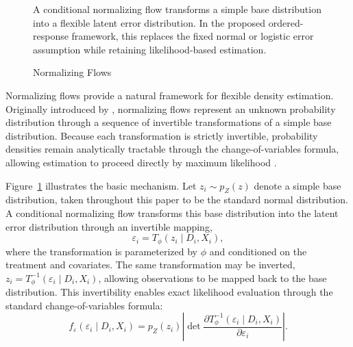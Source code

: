 \documentclass{article}
\begin{document}
\begin{figure}[hb!]
\caption{Normalizing Flows}
\label{fig:nf_error}
\begin{flushleft}
  {\footnotesize
A conditional normalizing flow transforms a simple base distribution into a flexible latent error distribution. In the proposed ordered-response framework, this replaces the fixed normal or logistic error assumption while retaining likelihood-based estimation.}
\end{flushleft}
\end{figure}

Normalizing flows provide a natural framework for flexible density estimation. Originally introduced by \citet{Rezende2016a}, normalizing flows represent an unknown probability distribution through a sequence of invertible transformations of a simple base distribution. Because each transformation is strictly invertible, probability densities remain analytically tractable through the change-of-variables formula, allowing estimation to proceed directly by maximum likelihood \citep{Kobyzev2021a, Papamakarios2021a}.

Figure~\ref{fig:nf_error} illustrates the basic mechanism. Let $z_i\sim p_Z(z)$ denote a simple base distribution, taken throughout this paper to be the standard normal distribution. A conditional normalizing flow transforms this base distribution into the latent error distribution through an invertible mapping,
\[
\varepsilon_i = T_\phi(z_i\mid D_i,X_i),
\]
where the transformation is parameterized by $\phi$ and conditioned on the treatment and covariates. The same transformation may be inverted, $z_i = T_\phi^{-1}(\varepsilon_i\mid D_i,X_i)$, allowing observations to be mapped back to the base distribution. This invertibility enables exact likelihood evaluation through the standard change-of-variables formula:
\[
f_\varepsilon(\varepsilon_i\mid D_i,X_i) = p_Z(z_i)
\left|
\det \frac{\partial T_\phi^{-1}(\varepsilon_i\mid D_i,X_i)} {\partial\varepsilon_i}
\right|.
\]
\end{document}

